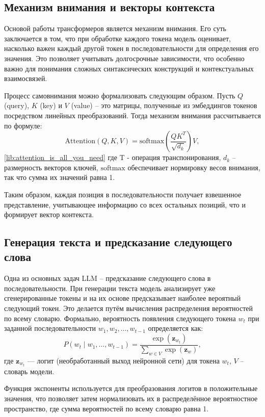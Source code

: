 \subsection{Механизм внимания и векторы контекста}

Основой работы трансформеров является механизм внимания. 
Его суть заключается в том, что при обработке каждого токена модель оценивает, насколько важен каждый другой токен в последовательности для определения его значения. 
Это позволяет учитывать долгосрочные зависимости, что особенно важно для понимания сложных синтаксических конструкций и контекстуальных взаимосвязей.

Процесс самовнимания можно формализовать следующим образом. 
Пусть \(Q\) (query), \(K\) (key) и \(V\) (value) – это матрицы, полученные из эмбеддингов токенов посредством линейных преобразований. 
Тогда механизм внимания рассчитывается по формуле:
\[
\text{Attention}(Q, K, V) = \text{softmax}\left(\frac{QK^T}{\sqrt{d_k}}\right)V,
\] \ref{lib:attention_is_all_you_need}
где
T - операция транспонирования,
\(d_k\) – размерность векторов ключей,
\(\text{softmax}\) обеспечивает нормировку весов внимания, так что сумма их значений равна 1.

Таким образом, каждая позиция в последовательности получает взвешенное представление, учитывающее информацию со всех остальных позиций, что и формирует вектор контекста.

\subsection{Генерация текста и предсказание следующего слова}

Одна из основных задач LLM – предсказание следующего слова в последовательности. При генерации текста модель анализирует уже сгенерированные токены и на их основе предсказывает наиболее вероятный следующий токен. Это делается путём вычисления распределения вероятностей по всему словарю. Формально, вероятность появления следующего токена \(w_t\) при заданной последовательности \(w_1, w_2, \dots, w_{t-1}\) определяется как:
\[
P(w_t \mid w_1, \dots, w_{t-1}) = \frac{\exp\left(\mathbf{z}_{w_t}\right)}{\sum_{w \in V} \exp\left(\mathbf{z}_w\right)},
\]
где
\(\mathbf{z}_{w_t}\) — логит (необработанный выход нейронной сети) для токена \(w_t\),
\(V\) – словарь модели.

Функция экспоненты используется для преобразования логитов в положительные значения, что позволяет затем нормализовать их в распределённое вероятностное пространство, где сумма вероятностей по всему словарю равна 1.

